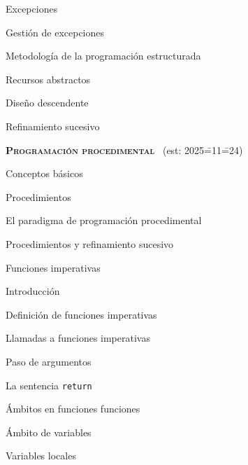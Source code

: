 \begin{longenum}
\begin{longenum}
\begin{longenum}
\begin{longenum}
                \item Excepciones
                \begin{longenum}
                    \item Gestión de excepciones
                \end{longenum}
            \end{longenum}
        \end{longenum}
        \item Metodología de la programación estructurada
        \begin{longenum}
            \item Recursos abstractos
            \item Diseño descendente
            \item Refinamiento sucesivo
        \end{longenum}
    \end{longenum}
    \item \textbf{\textsc{Programación procedimental}} \ (est: 2025\==11\==24)
    \begin{longenum}
        \item Conceptos básicos
        \begin{longenum}
            \item Procedimientos
            \item El paradigma de programación procedimental
            \item Procedimientos y refinamiento sucesivo
        \end{longenum}
        \item Funciones imperativas
        \begin{longenum}
            \item Introducción
            \item Definición de funciones imperativas
            \item Llamadas a funciones imperativas
            \item Paso de argumentos
            \item La sentencia \texttt{return}
        \end{longenum}
        \item Ámbitos en funciones funciones
        \begin{longenum}
            \item Ámbito de variables
            \begin{longenum}
                \item Variables locales

\end{longenum}
\end{longenum}
\end{longenum}
\end{longenum}

